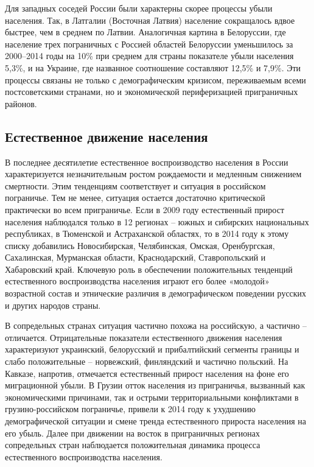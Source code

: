\documentclass[]{book}
\begin{document}
Для западных соседей России были характерны скорее процессы убыли
населения. Так, в Латгалии (Восточная Латвия) население сокращалось
вдвое быстрее, чем в среднем по Латвии. Аналогичная картина в
Белоруссии, где население трех пограничных с Россией областей Белоруссии
уменьшилось за 2000--2014 годы на 10\% при среднем для страны показателе
убыли населения 5,3\%, и на Украине, где названное соотношение
составляют 12,5\% и 7,9\%. Эти процессы связаны не только с
демографическим кризисом, переживаемым всеми постсоветскими странами, но
и экономической периферизацией приграничных районов.

\subsection{Естественное движение населения}\label{demo-situ-re}

В последнее десятилетие естественное воспроизводство населения в России
характеризуется незначительным ростом рождаемости и медленным снижением
смертности. Этим тенденциям соответствует и ситуация в российском
пограничье. Тем не менее, ситуация остается достаточно критической
практически во всем приграничье. Если в 2009 году естественный прирост
населения наблюдался только в 12 регионах -- южных и сибирских
национальных республиках, в Тюменской и Астраханской областях, то в 2014
году к этому списку добавились Новосибирская, Челябинская, Омская,
Оренбургская, Сахалинская, Мурманская области, Краснодарский,
Ставропольский и Хабаровский край. Ключевую роль в обеспечении
положительных тенденций естественного воспроизводства населения играют
его более «молодой» возрастной состав и этнические различия в
демографическом поведении русских и других народов страны.

В сопредельных странах ситуация частично похожа на российскую, а
частично -- отличается. Отрицательные показатели естественного движения
населения характеризуют украинский, белорусский и прибалтийский сегменты
границы и слабо положительные -- норвежский, финляндский и частично
польский. На Кавказе, напротив, отмечается естественный прирост
населения на фоне его миграционной убыли. В Грузии отток населения из
приграничья, вызванный как экономическими причинами, так и острыми
территориальными конфликтами в грузино-российском пограничье, привели к
2014 году к ухудшению демографической ситуации и смене тренда
естественного прироста населения на его убыль. Далее при движении на
восток в приграничных регионах сопредельных стран наблюдается
положительная динамика процесса естественного воспроизводства населения.
\end{document}
